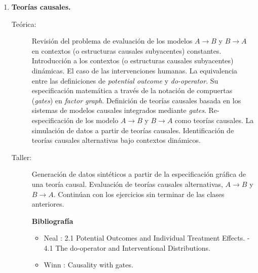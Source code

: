 \documentclass[11pt]{article}
\begin{document}
\begin{enumerate}
\vspace{0.1cm}
\item \textbf{Teorías causales.}
\vspace{-0.15cm}
\begin{description}
\item[Teórica:]
Revisión del problema de evaluación de los modelos $A\rightarrow B$ y $B\rightarrow A$ en contextos (o estructuras causales subyacentes) constantes.
Introducción a los contextos (o estructuras causales subyacentes) dinámicas.
El caso de las intervenciones humanas.
La equivalencia entre las definiciones de \emph{potential outcome} y \emph{do-operator}.
Su especificación matemática a través de la notación de compuertas (\emph{gates}) en \emph{factor graph}.
Definición de teorías causales basada en los sistemas de modelos causales integrados mediante \emph{gates}.
Re-especificación de los modelo $A\rightarrow B$ y $B\rightarrow A$ como teorías causales.
La simulación de datos a partir de teorías causales.
Identificación de teorías causales alternativas bajo contextos dinámicos.
\item[Taller:] Generación de datos sintéticos a partir de la especificación gráfica de una teoría causal.
Evaluación de teorías causales alternativas, $A\rightarrow B$ y $B\rightarrow A$. Continúan con los ejercicios sin terminar de las clases anteriores.
\item[] \textbf{Bibliografía}
\begin{itemize}
\item Neal \cite{neal2020}: 2.1 Potential Outcomes and Individual Treatment Effects. - 4.1 The do-operator and Interventional Distributions.
\item Winn \cite{winn2012-causality}: Causality with gates.
\end{itemize}
\end{description}



\end{enumerate}
\end{document}
